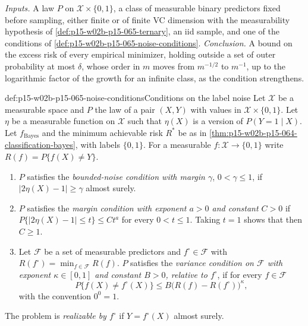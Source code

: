 \emph{Inputs.} A law \(P\) on \(\mathcal X\times\{0,1\}\), a class of
measurable binary predictors fixed before sampling, either finite or of
finite VC dimension with the measurability hypothesis of
\cref{def:p15-w02b-p15-065-ternary}, an iid sample, and one of the
conditions of \cref{def:p15-w02b-p15-065-noise-conditions}.
\emph{Conclusion.} A bound on the excess risk of every empirical
minimizer, holding outside a set of outer probability at most
\(\delta\), whose order in \(m\) moves from \(m^{-1/2}\) to \(m^{-1}\), up
to the logarithmic factor of the growth for an infinite class, as the
condition strengthens.

\begin{hbdefinition}{def:p15-w02b-p15-065-noise-conditions}{Conditions on the label noise}
Let \(\mathcal X\) be a measurable space and \(P\) the law of a pair
\((X,Y)\) with values in \(\mathcal X\times\{0,1\}\). Let \(\eta\) be a
measurable function on \(\mathcal X\) such that \(\eta(X)\) is a version
of \(P(Y=1\mid X)\). Let \(f_{\mathrm{Bayes}}\) and the minimum achievable
risk \(R^{*}\) be as in
\cref{thm:p15-w02b-p15-064-classification-bayes}, with labels
\(\{0,1\}\). For a measurable \(f:\mathcal X\to\{0,1\}\) write
\(R(f)=P\{f(X)\ne Y\}\).
\begin{enumerate}
\item \(P\) satisfies the \emph{bounded-noise condition with margin
      \(\gamma\)}, \(0<\gamma\leq1\), if
      \(|2\eta(X)-1|\geq\gamma\) almost surely.
\item \(P\) satisfies the \emph{margin condition with exponent \(a>0\) and
      constant \(C>0\)} if
      \(P\{|2\eta(X)-1|\leq t\}\leq Ct^{a}\) for every \(0<t\leq1\).
      Taking \(t=1\) shows that then \(C\geq1\).
\item Let \(\mathcal F\) be a set of measurable predictors and
      \(f^{\circ}\in\mathcal F\) with
      \(R(f^{\circ})=\min_{f\in\mathcal F}R(f)\). \(P\) satisfies the
      \emph{variance condition on \(\mathcal F\) with exponent
      \(\kappa\in[0,1]\) and constant \(B>0\), relative to \(f^{\circ}\)},
      if for every \(f\in\mathcal F\)
      \[
       P\{f(X)\ne f^{\circ}(X)\}\leq B\bigl(R(f)-R(f^{\circ})\bigr)^{\kappa},
      \]
      with the convention \(0^0=1\).
\end{enumerate}
The problem is \emph{realizable by \(f^{\circ}\)} if \(Y=f^{\circ}(X)\)
almost surely.
\end{hbdefinition}

